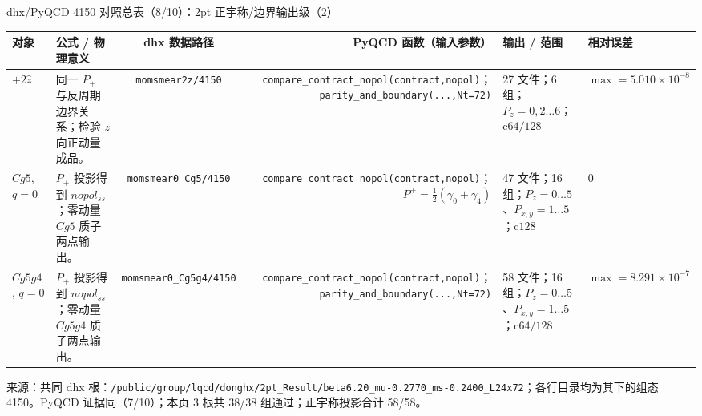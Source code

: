 \documentclass[UTF8,aspectratio=169,11pt]{ctexbeamer}
\newcommand{\source}[1]{\vspace{0.04em}\par{\raggedright\fontsize{5.8}{6.6}\selectfont\color{muted}来源：#1\par}}
\newcommand{\codepath}[1]{\nolinkurl{#1}}
\newcommand{\tablehead}{%
  \toprule
  对象 & 公式 / 物理意义 & dhx 数据路径 & PyQCD 函数（输入参数） & 输出 / 范围 & 相对误差 \\
  \midrule}
\newcommand{\twoptbase}{\codepath{/public/group/lqcd/donghx/2pt_Result/beta6.20_mu-0.2770_ms-0.2400_L24x72}}
\begin{document}
\begin{frame}[t]{dhx/PyQCD 4150 对照总表（8/10）：2pt 正宇称/边界输出级（2）}
  \centering
  \fontsize{8.0}{9.1}\selectfont
  \setlength{\tabcolsep}{2pt}
  \renewcommand{\arraystretch}{1.10}
  \begin{tabularx}{0.98\textwidth}{@{}A B C D E F@{}}
    \tablehead
    $+2\hat z$ & 同一 $P_+$ 与反周期边界关系；检验 $z$ 向正动量成品。 &
      \codepath{momsmear2z/4150} &
      \codepath{compare_contract_nopol(contract,nopol)}；\codepath{parity_and_boundary(...,Nt=72)} &
      27 文件；6 组；$P_z=0,2\ldots6$；$\mathrm{c}64/128$ & $\max=5.010\times10^{-8}$ \\
    $Cg5$, $q=0$ & $P_+$ 投影得到 $nopol_{ss}$；零动量 $Cg5$ 质子两点输出。 &
      \codepath{momsmear0_Cg5/4150} &
      \codepath{compare_contract_nopol(contract,nopol)}；$P^+=\frac12(\gamma_0+\gamma_4)$ &
      47 文件；16 组；$P_z=0\ldots5$、$P_{x,y}=1\ldots5$；$\mathrm{c}128$ & $0$ \\
    $Cg5g4$, $q=0$ & $P_+$ 投影得到 $nopol_{ss}$；零动量 $Cg5g4$ 质子两点输出。 &
      \codepath{momsmear0_Cg5g4/4150} &
      \codepath{compare_contract_nopol(contract,nopol)}；\codepath{parity_and_boundary(...,Nt=72)} &
      58 文件；16 组；$P_z=0\ldots5$、$P_{x,y}=1\ldots5$；$\mathrm{c}64/128$ & $\max=8.291\times10^{-7}$ \\
    \bottomrule
  \end{tabularx}
  \source{共同 dhx 根：\twoptbase；各行目录均为其下的组态 4150。PyQCD 证据同（7/10）；本页 3 根共 38/38 组通过；正宇称投影合计 58/58。}
\end{frame}
\end{document}
